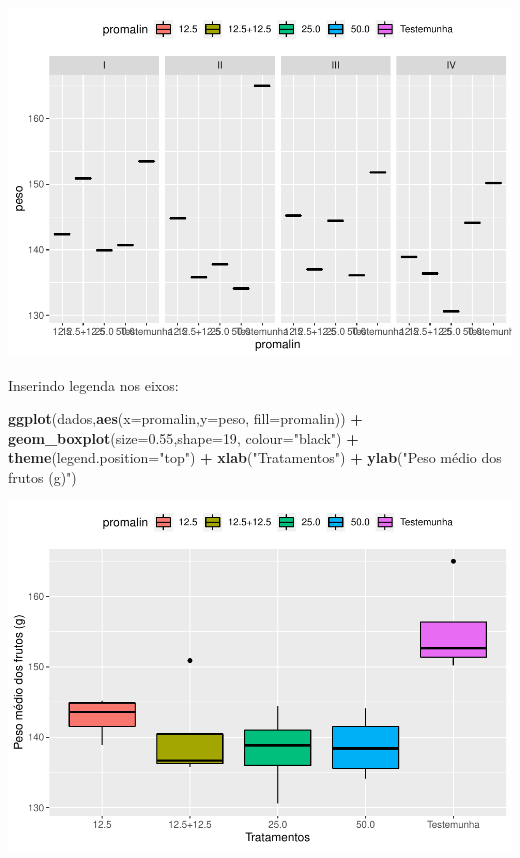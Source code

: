 \documentclass[
]{book}
\newenvironment{Shaded}{\begin{snugshade}}{\end{snugshade}}
\newcommand{\DataTypeTok}[1]{\textcolor[rgb]{0.13,0.29,0.53}{#1}}
\newcommand{\DecValTok}[1]{\textcolor[rgb]{0.00,0.00,0.81}{#1}}
\newcommand{\FloatTok}[1]{\textcolor[rgb]{0.00,0.00,0.81}{#1}}
\newcommand{\KeywordTok}[1]{\textcolor[rgb]{0.13,0.29,0.53}{\textbf{#1}}}
\newcommand{\NormalTok}[1]{#1}
\newcommand{\OperatorTok}[1]{\textcolor[rgb]{0.81,0.36,0.00}{\textbf{#1}}}
\newcommand{\StringTok}[1]{\textcolor[rgb]{0.31,0.60,0.02}{#1}}
\begin{document}
\includegraphics{TudodoR_files/figure-latex/unnamed-chunk-234-1.pdf}

Inserindo legenda nos eixos:

\begin{Shaded}
\begin{Highlighting}[]
\KeywordTok{ggplot}\NormalTok{(dados,}\KeywordTok{aes}\NormalTok{(}\DataTypeTok{x=}\NormalTok{promalin,}\DataTypeTok{y=}\NormalTok{peso, }\DataTypeTok{fill=}\NormalTok{promalin)) }\OperatorTok{+}\StringTok{ }
\StringTok{       }\KeywordTok{geom_boxplot}\NormalTok{(}\DataTypeTok{size=}\FloatTok{0.55}\NormalTok{,}\DataTypeTok{shape=}\DecValTok{19}\NormalTok{, }\DataTypeTok{colour=}\StringTok{"black"}\NormalTok{) }\OperatorTok{+}\StringTok{ }
\StringTok{       }\KeywordTok{theme}\NormalTok{(}\DataTypeTok{legend.position=}\StringTok{"top"}\NormalTok{) }\OperatorTok{+}\StringTok{ }
\StringTok{       }\KeywordTok{xlab}\NormalTok{(}\StringTok{"Tratamentos"}\NormalTok{) }\OperatorTok{+}\StringTok{  }
\StringTok{       }\KeywordTok{ylab}\NormalTok{(}\StringTok{"Peso médio dos frutos (g)"}\NormalTok{) }
\end{Highlighting}
\end{Shaded}

\includegraphics{TudodoR_files/figure-latex/unnamed-chunk-235-1.pdf}
\end{document}
